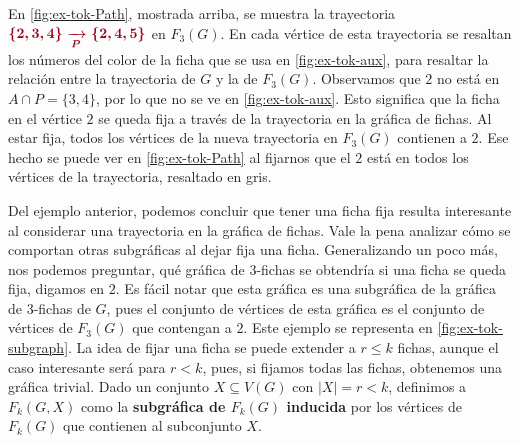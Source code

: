En \cref{fig:ex-tok-Path}, mostrada arriba, se muestra la trayectoria
${\color{vino}\boldsymbol {\{2,3,4\}\xrightarrow[P]{}\{2,4,5\}}}$ en $F_3(G)$.
En cada v\'ertice de esta trayectoria se resaltan los n\'umeros del color de la
ficha que se usa en \cref{fig:ex-tok-aux}, para resaltar la relaci\'on entre la
trayectoria de $G$ y la de $F_3(G)$. Observamos que $2$ no est\'a en $A \cap P
=\{3,4\}$, por lo que no se ve en \cref{fig:ex-tok-aux}. Esto significa que la
ficha en el v\'ertice $2$ se queda fija a trav\'es de la trayectoria en la
gr\'afica de fichas. Al estar fija, todos los v\'ertices de la nueva trayectoria
en $F_3(G)$ contienen a $2$. Ese hecho se puede ver en \cref{fig:ex-tok-Path} al
fijarnos que el $2$ est\'a en todos los v\'ertices de la trayectoria, resaltado
en gris.

Del ejemplo anterior, podemos concluir que tener una ficha fija resulta
interesante al considerar una trayectoria en la gr\'afica de fichas. Vale la
pena analizar c\'omo se comportan otras subgr\'aficas al dejar fija una ficha.
Generalizando un poco m\'as, nos podemos preguntar, qu\'e gr\'afica de
$3$-fichas se obtendr\'ia si una ficha se queda fija, digamos en $2$. Es f\'acil
notar que esta gr\'afica es una subgr\'afica de la gr\'afica de $3$-fichas de
$G$, pues el conjunto de v\'ertices de esta gr\'afica es el conjunto de
v\'ertices de $F_3(G)$ que contengan a $2$. Este ejemplo se representa en
\cref{fig:ex-tok-subgraph}. La idea de fijar una ficha se puede extender a
$r\leq k$ fichas, aunque el caso interesante ser\'a para $r<k$, pues, si fijamos
todas las fichas, obtenemos una gr\'afica trivial. Dado un conjunto $X \subseteq
V(G)$ con $|X|=r<k$, definimos a $F_k(G,X)$ como la \textbf{subgr\'afica de
$F_k(G)$ inducida} por los v\'ertices de $F_k(G)$ que
contienen al subconjunto $X$. 

